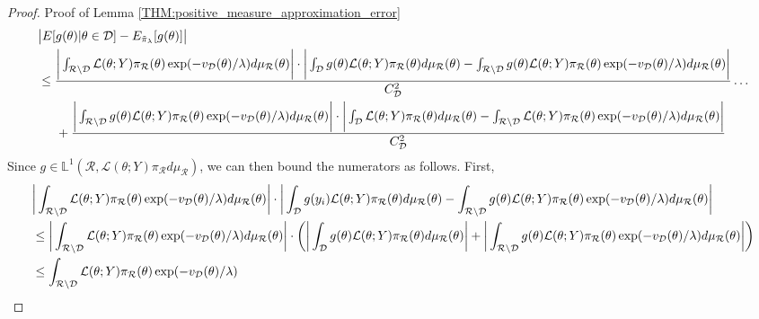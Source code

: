 \documentclass[10pt,fleqn]{article} \pdfoutput=1
\DeclareMathOperator{\1}{\mathbbm{1}} \DeclareMathOperator{\bigO}{\mc O}
\begin{document}
\begin{proof}{Proof of
		Lemma \ref{THM:positive_measure_approximation_error}}
	\begin{align*}  & \big|
		E[g(\theta)|\theta\in\mathcal{D}]-E_{\tilde{\pi}_\lambda}[g(\theta)]\big|
		\\ & \le \frac{ \bigg| \int_{\mathcal{R}\setminus \mathcal{D}}
			\mathcal{L}(\theta;Y)\pi_\mathcal{R}(\theta)\exp(-v_{\mathcal{D}}(\theta)/\lambda
			) d\mu_\mathcal{R}(\theta) \bigg| \cdot \bigg|\int_\mathcal{D}g(\theta)
			\mathcal{L}(\theta;Y)\pi_\mathcal{R}(\theta)d\mu_\mathcal{R}(\theta) -
			\int_{\mathcal{R}\setminus \mathcal{D}} g(\theta)
			\mathcal{L}(\theta;Y)\pi_\mathcal{R}(\theta)\exp(-v_{\mathcal{D}}(\theta)/\lambda )
			d\mu_\mathcal{R}(\theta)  \bigg|}{C_\mathcal{D}^2 }\dots \\ &
		\hspace{0.5cm} + \frac{\bigg| \int_{\mathcal{R}\setminus \mathcal{D}}
			g(\theta)
			\mathcal{L}(\theta;Y)\pi_\mathcal{R}(\theta)\exp(-v_{\mathcal{D}}(\theta)/\lambda )
			d\mu_\mathcal{R}(\theta) \bigg| \cdot \bigg|\int_\mathcal{D}
			\mathcal{L}(\theta;Y)\pi_\mathcal{R}(\theta)d\mu_\mathcal{R}(\theta)-
			\int_{\mathcal{R}\setminus \mathcal{D}}
			\mathcal{L}(\theta;Y)\pi_\mathcal{R}(\theta)\exp(-v_{\mathcal{D}}(\theta)/\lambda )
			d\mu_\mathcal{R}(\theta)  \bigg|}{C_\mathcal{D}^2 }\end{align*} Since
	$g\in\mathbb{L}^1(\mathcal{R},\mathcal{L}(\theta;Y)\pi_\mathcal{R}d\mu_\mathcal{R})$,
	we can then bound the numerators as follows.  First, \begin{align*}  & \bigg|
		\int_{\mathcal{R}\setminus \mathcal{D}}
		\mathcal{L}(\theta;Y)\pi_\mathcal{R}(\theta)\exp(-v_{\mc D}(\theta)/\lambda
		) d\mu_\mathcal{R}(\theta) \bigg| \cdot \bigg|\int_\mathcal{D}
		g(y_i)
		\mathcal{L}(\theta;Y)\pi_\mathcal{R}(\theta)d\mu_\mathcal{R}(\theta)
		- \int_{\mathcal{R}\setminus \mathcal{D}} g(\theta)
		\mathcal{L}(\theta;Y)\pi_\mathcal{R}(\theta)\exp(-v_{\mc D}(\theta)/\lambda
		)d\mu_\mathcal{R}(\theta) \bigg|       \\ & \le \bigg|
		\int_{\mathcal{R}\setminus \mathcal{D}}
		\mathcal{L}(\theta;Y)\pi_\mathcal{R}(\theta)\exp(-v_{\mc D}(\theta)/\lambda
		) d\mu_\mathcal{R}(\theta) \bigg| \cdot \bigg( \bigg|
		\int_\mathcal{D}g(\theta)
		\mathcal{L}(\theta;Y)\pi_\mathcal{R}(\theta)d\mu_\mathcal{R}(\theta) \bigg|
		+ \bigg| \int_{\mathcal{R}\setminus \mathcal{D}} g(\theta)
		\mathcal{L}(\theta;Y)\pi_\mathcal{R}(\theta)\exp(-v_{\mc D}(\theta)/\lambda )
		d\mu_\mathcal{R}(\theta) \bigg| \bigg) \\ &\le \int_{\mathcal{R}\setminus
			\mathcal{D}}
		\mathcal{L}(\theta;Y)\pi_\mathcal{R}(\theta)\exp(-v_{\mc D}(\theta)/\lambda )

\end{align*}
\end{proof}
\end{document}
